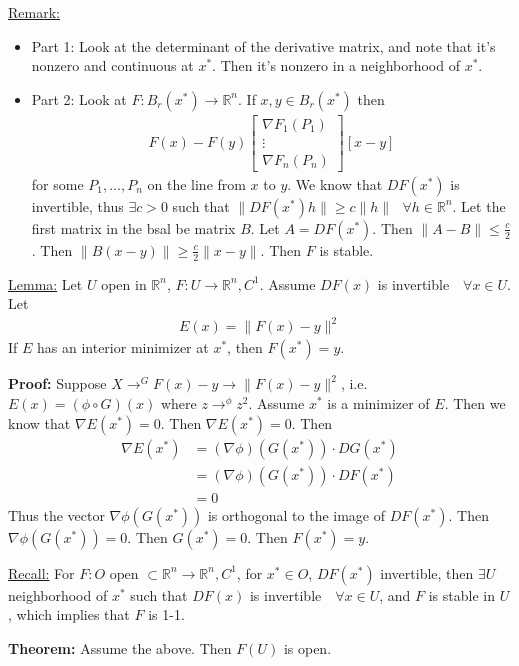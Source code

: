 \documentclass{article}
\newcommand*{\txt}[1]{\text{ #1 }}%
\newcommand*{\fora}{\txt{}\forall}%
\newcommand*{\rr}{\mathbb{R}}%
\begin{document}
\underline{Remark:}
\begin{itemize}
    \item Part 1: Look at the determinant of the derivative matrix, and note that it's nonzero and continuous at $x^{*}$. Then it's nonzero in a neighborhood of $x^{*}$.
    \item Part 2: Look at $F:B_r(x^{*})\to \rr^n$. If $x,y\in B_r(x^{*})$ then \begin{align*}
        F(x)-F(y)\begin{bmatrix}
            \nabla F_1(P_1)\\
            \vdots\\
            \nabla F_n(P_n)
        \end{bmatrix}[x-y]
    \end{align*} for some $P_1,\dots,P_n$ on the line from $x$ to $y$. We know that $DF(x^{*})$ is invertible, thus $\exists c>0$ such that $\|DF(x^{*})h\|\geq c\|h\|\fora h\in \rr^n$. Let the first matrix in the bsal be matrix $B$. Let $A=DF(x^{*})$. Then $\|A-B\|\leq \frac{c}{2}$. Then $\|B(x-y)\|\geq \frac{c}{2}\|x-y\|$. Then $F$ is stable.
\end{itemize}

\underline{Lemma:} Let $U$ open in $\rr^n$, $F:U\to \rr^n, C^1$. Assume $DF(x)$ is invertible $\fora x\in U$. Let \begin{align*}
    E(x)=\|F(x)-y\|^2
\end{align*}If $E$ has an interior minimizer at $x^{*}$, then $F(x^{*})=y$.

\textbf{Proof:} Suppose $X\to^GF(x)-y\to\|F(x)-y\|^2$, i.e. $E(x)=(\phi\circ G)(x)$ where $z\to^\phi z^2$. Assume $x^{*}$ is a minimizer of $E$. Then we know that $\nabla E(x^{*})=0$. Then $\nabla E(x^{*})=0$. Then \begin{align*}
    \nabla E(x^{*})&=(\nabla \phi)(G(x^{*}))\cdot DG(x^{*})\\
    &=(\nabla \phi)(G(x^{*}))\cdot DF(x^{*})\\
    &=0
\end{align*} Thus the vector $\nabla \phi(G(x^{*}))$ is orthogonal to the image of $DF(x^{*})$. Then $\nabla \phi(G(x^{*}))=0$. Then $G(x^{*})=0$. Then $F(x^{*})=y$.

\underline{Recall:} For $F:O\txt{open}\subset \rr^n\to \rr^n, C^1$, for $x^{*}\in O$, $DF(x^{*})$ invertible, then $\exists U$ neighborhood of $x^{*}$ such that $DF(x)$ is invertible $\fora x\in U$, and $F$ is stable in $U$, which implies that $F$ is 1-1.

\textbf{Theorem:} Assume the above. Then $F(U)$ is open.
\end{document}
